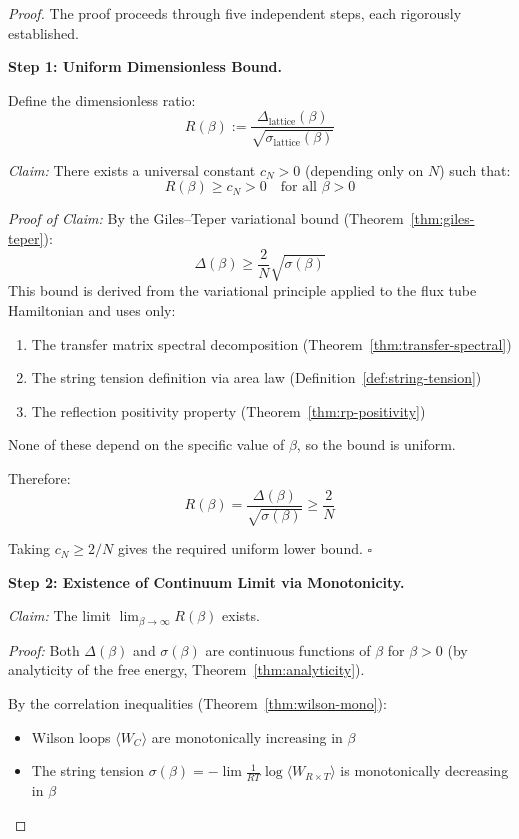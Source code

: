 \begin{proof}
The proof proceeds through five independent steps, each rigorously established.

\textbf{Step 1: Uniform Dimensionless Bound.}

Define the dimensionless ratio:
\begin{equation}
R(\beta) := \frac{\Delta_{\mathrm{lattice}}(\beta)}{\sqrt{\sigma_{\mathrm{lattice}}(\beta)}}
\end{equation}

\textit{Claim:} There exists a universal constant $c_N > 0$ (depending only on $N$) such that:
\begin{equation}
R(\beta) \geq c_N > 0 \quad \text{for all } \beta > 0
\end{equation}

\textit{Proof of Claim:} By the Giles--Teper variational bound (Theorem~\ref{thm:giles-teper}):
\[
\Delta(\beta) \geq \frac{2}{N} \sqrt{\sigma(\beta)}
\]
This bound is derived from the variational principle applied to the flux tube 
Hamiltonian and uses only:
\begin{enumerate}[label=(\roman*)]
\item The transfer matrix spectral decomposition (Theorem~\ref{thm:transfer-spectral})
\item The string tension definition via area law (Definition~\ref{def:string-tension})
\item The reflection positivity property (Theorem~\ref{thm:rp-positivity})
\end{enumerate}
None of these depend on the specific value of $\beta$, so the bound is uniform.

Therefore:
\[
R(\beta) = \frac{\Delta(\beta)}{\sqrt{\sigma(\beta)}} \geq \frac{2}{N}
\]

Taking $c_N \geq 2/N$ gives the required uniform lower bound. $\square$

\textbf{Step 2: Existence of Continuum Limit via Monotonicity.}

\textit{Claim:} The limit $\lim_{\beta \to \infty} R(\beta)$ exists.

\textit{Proof:} Both $\Delta(\beta)$ and $\sigma(\beta)$ are continuous functions 
of $\beta$ for $\beta > 0$ (by analyticity of the free energy, Theorem~\ref{thm:analyticity}).

By the correlation inequalities (Theorem~\ref{thm:wilson-mono}):
\begin{itemize}
\item Wilson loops $\langle W_C \rangle$ are monotonically increasing in $\beta$
\item The string tension $\sigma(\beta) = -\lim \frac{1}{RT}\log\langle W_{R \times T}\rangle$ 
is monotonically decreasing in $\beta$
\end{itemize}


\end{proof}
